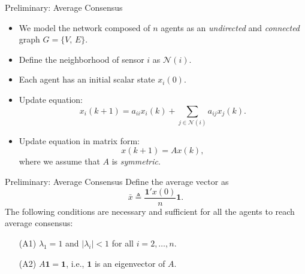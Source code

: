 \documentclass[10pt]{beamer}
\DeclareMathOperator{\1}{\textbf{1}}
\begin{document}
      \begin{frame}{Preliminary: Average Consensus}
	\begin{itemize}
	  \item We model the network composed of $n$ agents as an \emph{undirected} and \emph{connected} graph $G = \{V,\,E\}$.
	  \item Define the neighborhood of sensor $i$ as $\mathcal N(i)$.
	  \item Each agent has an initial scalar state $x_{i}(0)$.
	  \item Update equation:
	    \begin{displaymath}
	      x_i(k+1) = a_{ii} x_{i}(k) + \sum_{j\in \mathcal N(i)} a_{ij} x_{j}(k).  
	    \end{displaymath}
	  \item Update equation in matrix form:
	    \begin{displaymath}
	      x(k+1) = A x(k),
	    \end{displaymath}
	    where we assume that $A$ is \emph{symmetric}.
	\end{itemize}
      \end{frame}

      \begin{frame}{Preliminary: Average Consensus}
	Define the average vector as
	\begin{displaymath}
	  \bar x\triangleq \frac{\mathbf 1' x(0)}{n} \mathbf 1.
	\end{displaymath}
	The following conditions are necessary and sufficient for all the agents to reach average consensus:
	\begin{enumerate}
	  \item[(A1)] $ \lambda_1 = 1$ and  $|\lambda_i| < 1$ for all $i = 2,\ldots, n$.
	  \item[(A2)] $A\mathbf 1 = \mathbf 1$, i.e., $\mathbf 1$ is an eigenvector of $A$.
	\end{enumerate}
      \end{frame}
\end{document}
